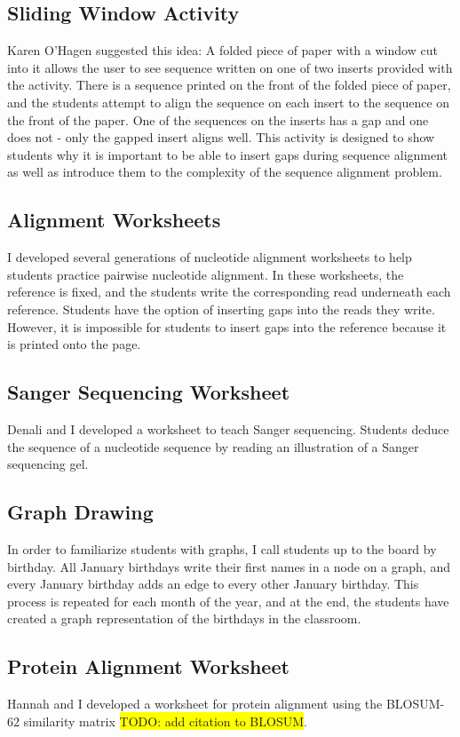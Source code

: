 \documentclass{report}
\newcommand{\hilight}[1]
{\colorbox{yellow}{#1}}
\begin{document}
\subsection{Sliding Window Activity}
Karen O'Hagen suggested this idea: A folded piece of paper with a window cut into it allows the user to see sequence written on one of two inserts provided with the activity. There is a sequence printed on the front of the folded piece of paper, and the students attempt to align the sequence on each insert to the sequence on the front of the paper. One of the sequences on the inserts has a gap and one does not - only the gapped insert aligns well. This activity is designed to show students why it is important to be able to insert gaps during sequence alignment as well as introduce them to the complexity of the sequence alignment problem.

\subsection{Alignment Worksheets}
I developed several generations of nucleotide alignment worksheets to help students practice pairwise nucleotide alignment. In these worksheets, the reference is fixed, and the students write the corresponding read underneath each reference. Students have the option of inserting gaps into the reads they write. However, it is impossible for students to insert gaps into the reference because it is printed onto the page.

\subsection{Sanger Sequencing Worksheet}
Denali and I developed a worksheet to teach Sanger sequencing. Students deduce the sequence of a nucleotide sequence by reading an illustration of a Sanger sequencing gel.

\subsection{Graph Drawing}
In order to familiarize students with graphs, I call students up to the board by birthday. All January birthdays write their first names in a node on a graph, and every January birthday adds an edge to every other January birthday. This process is repeated for each month of the year, and at the end, the students have created a graph representation of the birthdays in the classroom.

\subsection{Protein Alignment Worksheet}
Hannah and I developed a worksheet for protein alignment using the BLOSUM-62 similarity matrix \hilight{TODO: add citation to BLOSUM}.
\end{document}

